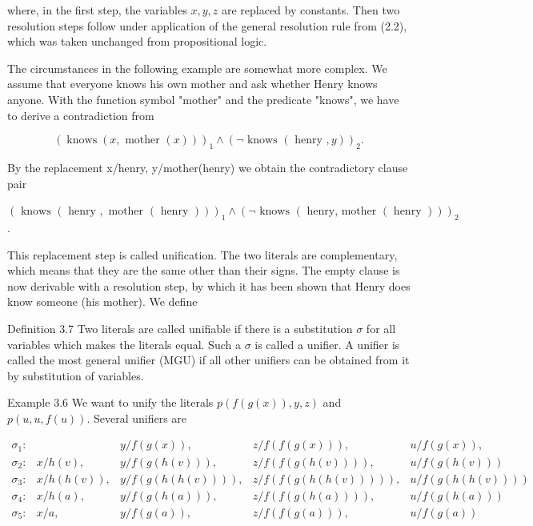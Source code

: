 \documentclass[10pt]{book}
\begin{document}
where, in the first step, the variables $x, y, z$ are replaced by constants. Then two resolution steps follow under application of the general resolution rule from (2.2), which was taken unchanged from propositional logic.

The circumstances in the following example are somewhat more complex. We assume that everyone knows his own mother and ask whether Henry knows anyone. With the function symbol "mother" and the predicate "knows", we have to derive a contradiction from

$$
(\operatorname{knows}(x, \text { mother }(x)))_{1} \wedge(\neg \text { knows }(\text { henry }, y))_{2} .
$$

By the replacement x/henry, y/mother(henry) we obtain the contradictory clause pair

\begin{displayquote}
$(\text { knows }(\text { henry }, \text { mother }(\text { henry })))_{1} \wedge(\neg \text { knows }(\text { henry, mother }(\text { henry })))_{2}$.
\end{displayquote}

This replacement step is called unification. The two literals are complementary, which means that they are the same other than their signs. The empty clause is now derivable with a resolution step, by which it has been shown that Henry does know someone (his mother). We define

Definition 3.7 Two literals are called unifiable if there is a substitution $\sigma$ for all variables which makes the literals equal. Such a $\sigma$ is called a unifier. A unifier is called the most general unifier (MGU) if all other unifiers can be obtained from it by substitution of variables.


Example 3.6 We want to unify the literals $p(f(g(x)), y, z)$ and $p(u, u, f(u))$. Several unifiers are

$$
\begin{array}{lllll}
\sigma_{1}: & & y / f(g(x)), & z / f(f(g(x))), & u / f(g(x)), \\
\sigma_{2}: & x / h(v), & y / f(g(h(v))), & z / f(f(g(h(v)))), & u / f(g(h(v))) \\
\sigma_{3}: & x / h(h(v)), & y / f(g(h(h(v)))), & z / f(f(g(h(h(v))))), & u / f(g(h(h(v)))) \\
\sigma_{4}: & x / h(a), & y / f(g(h(a))), & z / f(f(g(h(a)))), & u / f(g(h(a))) \\
\sigma_{5}: & x / a, & y / f(g(a)), & z / f(f(g(a))), & u / f(g(a))
\end{array}
$$
\end{document}
